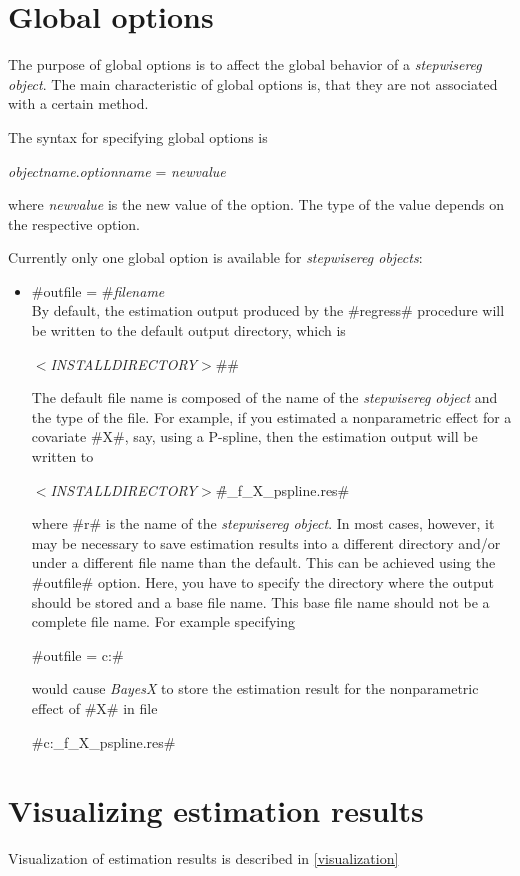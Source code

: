 \section{Global options}
\label{stepwiseregglobopt} 

The purpose of global options is to affect the global behavior of
a {\em stepwisereg object}. The main characteristic of global options
is, that they are not associated with a certain method.

The syntax for specifying global options is

{\em objectname}.{\em optionname} = {\em newvalue}

where {\em newvalue} is the new value of the option. The type of
the value depends on the respective option.

Currently only one global option is available for {\em stepwisereg
objects}:

\begin{itemize}
\item #outfile = #{\em filename} \\
By default, the estimation output produced by the #regress#
procedure will be written to the default output directory, which
is

{\em$<$INSTALLDIRECTORY$>$}#\output#

The default file name is composed of the name of the {\em stepwisereg
object} and the type of the file. For example, if you estimated a
nonparametric effect for a covariate #X#, say, using a P-spline,
then the estimation output will be written to

{\em$<$INSTALLDIRECTORY$>$}#\output\r_f_X_pspline.res#

where #r# is the name of the {\em stepwisereg object}. In most cases,
however, it may be necessary to save estimation results into a
different directory and/or under a different file name than the
default. This can be achieved using the #outfile# option. Here, you
have to specify the directory where the output should be stored and
a base file name. This base file name should not be a complete file
name. For example specifying

#outfile = c:\data{}#

would cause {\em BayesX} to store the estimation result for the
nonparametric effect of #X# in file

#c:\data{}_f_X_pspline.res#
\end{itemize}



\section{Visualizing estimation results}

Visualization of estimation results is described in
\autoref{visualization}
